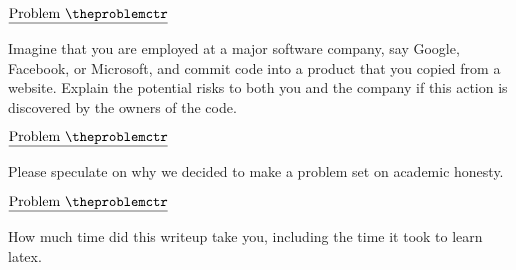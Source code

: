 \documentclass[11pt]{article}
\def\pp{\par\noindent}
\begin{document}
%
%

\addtocounter{problemctr}{1}
\bigskip
\noindent
$\underline{\rm Problem\ \theproblemctr}$\pp 
%
Imagine that you are employed at a major software company, say Google,
Facebook, or Microsoft, and commit code into a product that you copied
from a website. Explain the potential risks to both you and the
company if this action is discovered by the owners of the code.

\addtocounter{problemctr}{1}
\bigskip
\noindent
$\underline{\rm Problem\ \theproblemctr}$\pp
%
Please speculate on why we decided to make a problem set on academic
honesty.

\addtocounter{problemctr}{1}
\bigskip
\noindent
$\underline{\rm Problem\ \theproblemctr}$\pp 
%
How much time did this writeup take you, including the time it took to
learn latex.
\end{document}
